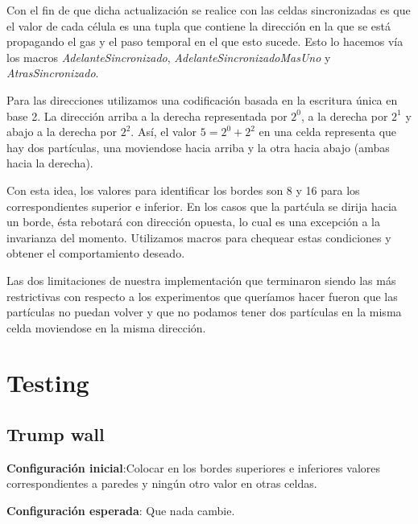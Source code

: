 \documentclass[10pt,a4paper]{article}
\begin{document}
Con el fin de que dicha actualizaci\'on se realice con las celdas sincronizadas es que el valor de cada c\'elula es una tupla que contiene la direcci\'on en la que se est\'a propagando el gas y el paso temporal en el que esto sucede. Esto lo hacemos v\'ia los macros \textit{AdelanteSincronizado}, \textit{AdelanteSincronizadoMasUno} y \textit{AtrasSincronizado}.

Para las direcciones utilizamos una codificaci\'on basada en la escritura \'unica en base 2. La direcci\'on arriba a la derecha representada por $2^0$, a la derecha por $2^1$ y abajo a la derecha por $2^2$. As\'i, el valor $5=2^0+2^2$ en una celda representa que hay dos part\'iculas, una moviendose hacia arriba y la otra hacia abajo (ambas hacia la derecha).

Con esta idea, los valores para identificar los bordes son 8 y 16 para los correspondientes superior e inferior. En los casos que la part\'cula se dirija hacia un borde, \'esta rebotar\'a con direcci\'on opuesta, lo cual es una excepci\'on a la
invarianza del momento. Utilizamos macros para chequear estas condiciones y obtener el comportamiento deseado.

Las dos limitaciones de nuestra implementaci\'on que terminaron siendo las m\'as restrictivas con respecto a los experimentos que quer\'iamos hacer fueron que las part\'iculas no puedan volver y que no podamos tener dos part\'iculas en la misma celda moviendose en la misma direcci\'on.


\section*{Testing}


\subsection*{Trump wall}
\textbf{Configuración inicial}:Colocar en los bordes superiores e inferiores valores correspondientes a paredes y ningún otro valor en otras celdas.


\textbf{Configuración esperada}: Que nada cambie.
\end{document}
